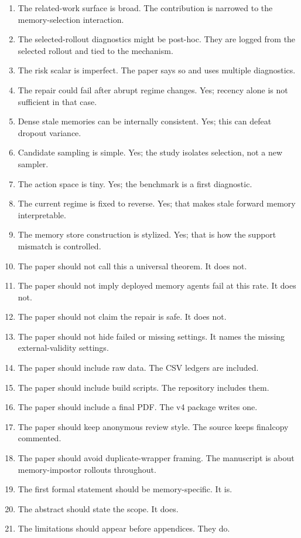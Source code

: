 \documentclass{article}
\begin{document}
\begin{enumerate}
\item The related-work surface is broad. The contribution is narrowed to the
memory-selection interaction.
\item The selected-rollout diagnostics might be post-hoc. They are logged from
the selected rollout and tied to the mechanism.
\item The risk scalar is imperfect. The paper says so and uses multiple
diagnostics.
\item The repair could fail after abrupt regime changes. Yes; recency alone is
not sufficient in that case.
\item Dense stale memories can be internally consistent. Yes; this can defeat
dropout variance.
\item Candidate sampling is simple. Yes; the study isolates selection, not a
new sampler.
\item The action space is tiny. Yes; the benchmark is a first diagnostic.
\item The current regime is fixed to reverse. Yes; that makes stale forward
memory interpretable.
\item The memory store construction is stylized. Yes; that is how the support
mismatch is controlled.
\item The paper should not call this a universal theorem. It does not.
\item The paper should not imply deployed memory agents fail at this rate. It
does not.
\item The paper should not claim the repair is safe. It does not.
\item The paper should not hide failed or missing settings. It names the
missing external-validity settings.
\item The paper should include raw data. The CSV ledgers are included.
\item The paper should include build scripts. The repository includes them.
\item The paper should include a final PDF. The v4 package writes one.
\item The paper should keep anonymous review style. The source keeps finalcopy
commented.
\item The paper should avoid duplicate-wrapper framing. The manuscript is
about memory-impostor rollouts throughout.
\item The first formal statement should be memory-specific. It is.
\item The abstract should state the scope. It does.
\item The limitations should appear before appendices. They do.

\end{enumerate}
\end{document}
